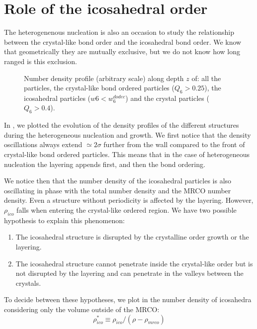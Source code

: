 \section{Role of the icosahedral order}

The heterogenenous nucleation is also an occasion to study the relationship between the crystal-like bond order and the icosahedral bond order. We know that geometrically they are mutually exclusive, but we do not know how long ranged is this exclusion.

\begin{figure}
	\centering
	\resizebox{\textwidth}{!}{}
	\caption{Number density profile (arbitrary scale) along depth $z$ of: all the particles, the crystal-like bond ordered particles ($Q_6>0.25$), the icosahedral particles ($w6<w_6^{dodec}$) and the crystal particles ($Q_6>0.4$).}
	\label{fig:X_profile}
\end{figure}

In , we plotted the evolution of the density profiles of the different structures during the heterogeneous nucleation and growth. We first notice that the density oscillations always extend $\simeq 2\sigma$ further from the wall compared to the front of crystal-like bond ordered particles. This means that in the case of heterogeneous nucleation the layering appends first, and then the bond ordering.

We notice then that the number density of the icosahedral particles is also oscillating in phase with the total number density and the \ac{MRCO} number density. Even a structure without periodicity is affected by the layering. However, $\rho_{ico}$ falls when entering the crystal-like ordered region. We have two possible hypothesis to explain this phenomenon:
\begin{enumerate}
	\item\label{hyp:disruption} The icosahedral structure is disrupted by the crystalline order growth or the layering.
	\item\label{hyp:excluded_vol} The icosahedral structure cannot penetrate inside the crystal-like order but is not disrupted by the layering and can penetrate in the valleys between the crystals.
\end{enumerate}
To decide between these hypotheses, we plot in  the number density of icosahedra considering only the volume outside of the \ac{MRCO}:
\begin{equation}
\rho_{ico}^* \equiv \rho_{ico}/(\rho-\rho_{mrco})
\end{equation}

